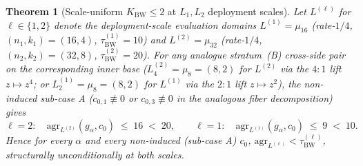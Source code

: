 \documentclass[11pt]{article}
\newtheorem{theorem}{Theorem}[section]
\theoremstyle{definition}
\theoremstyle{remark}
\begin{document}
\begin{theorem}[Scale-uniform $K_{\mathrm{BW}} \leq 2$ at $L_1, L_2$ deployment scales]
\label{thm:scale-uniform-K-BW-closure}
Let $L^{(\ell)}$ for $\ell \in \{1, 2\}$ denote the deployment-scale
evaluation domains $L^{(1)} = \mu_{16}$ (rate-$1/4$, $(n_1, k_1) = (16, 4)$,
$\tau^{(1)}_{\mathrm{BW}} = 10$) and $L^{(2)} = \mu_{32}$ (rate-$1/4$,
$(n_2, k_2) = (32, 8)$, $\tau^{(2)}_{\mathrm{BW}} = 20$). For any
analogue stratum~(B) cross-side pair on the corresponding inner base
($L^{(2)}_4 = \mu_8 = (8, 2)$ for $L^{(2)}$ via the $4{:}1$ lift
$z \mapsto z^4$; or $L^{(1)}_2 = \mu_8 = (8, 2)$ for $L^{(1)}$ via the
$2{:}1$ lift $z \mapsto z^2$), the non-induced sub-case A
($c_{0,1} \not\equiv 0$ or $c_{0,3} \not\equiv 0$ in the analogous fiber
decomposition) gives
\[
  \ell = 2: \quad \mathrm{agr}_{L^{(2)}}(g_\alpha, c_0) \;\leq\; 16 \;<\; 20,
  \qquad
  \ell = 1: \quad \mathrm{agr}_{L^{(1)}}(g_\alpha, c_0) \;\leq\; 9 \;<\; 10.
\]
Hence for every $\alpha$ and every non-induced (sub-case A) $c_0$,
$\mathrm{agr}_{L^{(\ell)}} < \tau^{(\ell)}_{\mathrm{BW}}$, structurally
\emph{unconditionally} at both scales.
\end{theorem}
\end{document}
